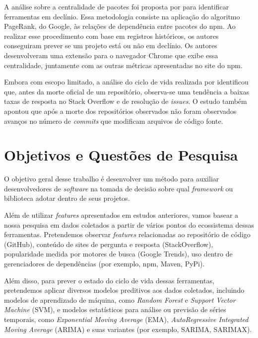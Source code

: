 \documentclass[11pt,a4paper]{article}
\newcommand{\en}[1]{\textit{#1}}
\begin{document}
A análise sobre a centralidade de pacotes foi proposta por \cite{mujahid2022} para identificar ferramentas em declínio. Essa metodologia consiste na aplicação do algoritmo PageRank, do Google, às relações de dependência entre pacotes do npm. Ao realizar esse procedimento com base em registros históricos, os autores conseguiram prever se um projeto está ou não em declínio. Os autores desenvolveram uma extensão para o navegador Chrome que exibe essa centralidade, juntamente com as outras métricas apresentadas no site do npm.


Embora com escopo limitado, a análise do ciclo de vida realizada por \cite{soupinski2022} identificou que, antes da morte oficial de um repositório, observa-se uma tendência a baixas taxas de resposta no Stack Overflow e de resolução de \en{issues}. O estudo também apontou que após a morte dos repositórios observados não foram observados avanços no número de \en{commits} que modificam arquivos de código fonte.

\section{Objetivos e Questões de Pesquisa}
O objetivo geral desse trabalho é desenvolver um método para auxiliar desenvolvedores de \en{software} na tomada de decisão sobre qual \en{framework} ou biblioteca adotar dentro de seus projetos.

Além de utilizar \en{features} apresentados em estudos anteriores, vamos basear a nossa pesquisa em dados coletados a partir de vários pontos do ecossistema dessas ferramentas. Pretendemos observar \en{features} relacionadas ao repositório de código (GitHub), conteúdo de sites de pergunta e resposta (StackOverflow), popularidade medida por motores de busca (Google Trends), uso dentro de gerenciadores de dependências (por exemplo, npm, Maven, PyPi).

Além disso, para prever o estado do ciclo de vida dessas ferramentas, pretendemos aplicar diversos modelos preditivos aos dados coletados, incluindo modelos de aprendizado de máquina, como \en{Random Forest} e \en{Support Vector Machine} (SVM), e modelos estatísticos para análise ou previsão de séries temporais, como \en{Exponential Moving Average} (EMA), \en{AutoRegressive Integrated Moving Average} (ARIMA) e suas variantes (por exemplo, SARIMA, SARIMAX).
\end{document}
